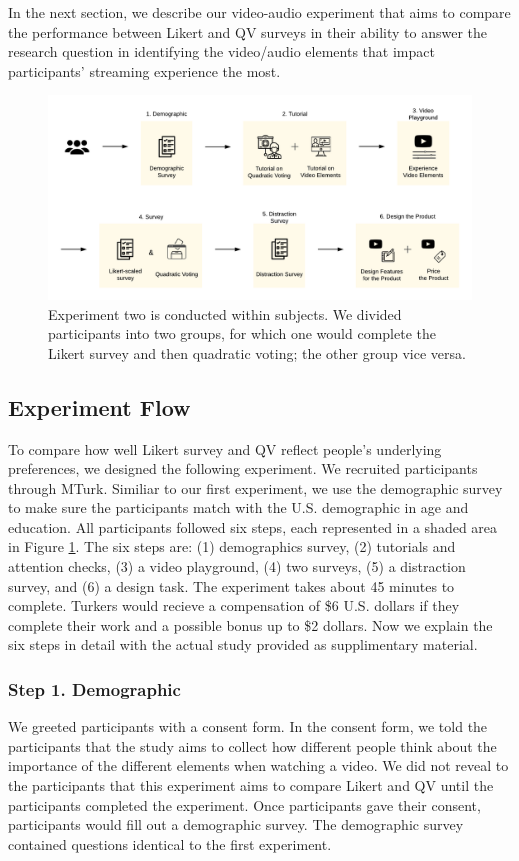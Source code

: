 In the next section, we describe our video-audio experiment that aims to compare the performance between Likert and QV surveys in their ability to answer the research question in identifying the video/audio elements that impact participants' streaming experience the most.

\begin{figure}[htpb]
    \centering
    \includegraphics[width=\textwidth, keepaspectratio=true]{content/image/exp2_procedure.pdf}
    \caption{
        Experiment two is conducted within subjects. We divided participants into two groups, for which one would complete the Likert survey and then quadratic voting; the other group vice versa.
    }
    \label{fig:exp2_flow}
\end{figure}

\subsection{Experiment Flow}

To compare how well Likert survey and QV reflect people's underlying preferences, we designed the following experiment. We recruited participants through MTurk. Similiar to our first experiment, we use the demographic survey to make sure the participants match with the U.S. demographic in age and education. All participants followed six steps, each represented in a shaded area in Figure \ref{fig:exp2_flow}. The six steps are: (1) demographics survey, (2) tutorials and attention checks, (3) a video playground, (4) two surveys, (5) a distraction survey, and (6) a design task. The experiment takes about 45 minutes to complete. Turkers would recieve a compensation of \$6 U.S. dollars if they complete their work and a possible bonus up to \$2 dollars. Now we explain the six steps in detail with the actual study provided as supplimentary material.

\subsubsection{Step 1. Demographic}
We greeted participants with a consent form. In the consent form, we told the participants that the study aims to collect how different people think about the importance of the different elements when watching a video. We did not reveal to the participants that this experiment aims to compare Likert and QV until the participants completed the experiment. Once participants gave their consent, participants would fill out a demographic survey. The demographic survey contained questions identical to the first experiment.

